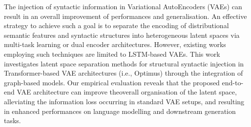 The injection of syntactic information in Variational AutoEncoders (VAEs) can result in an overall improvement of performances and generalisation. An effective strategy to achieve such a goal is to separate the encoding of distributional semantic features and syntactic structures into heterogeneous latent spaces via multi-task learning or dual encoder architectures. However, existing works employing such techniques are limited to LSTM-based VAEs. This work investigates latent space separation methods for structural syntactic injection in Transformer-based VAE architectures (i.e., Optimus) through the integration of graph-based models. Our empirical evaluation reveals that the proposed end-to-end VAE architecture can improve theoverall organisation of the latent space, alleviating the information loss occurring in standard VAE setups, and resulting in enhanced performances on language modelling and downstream generation tasks.